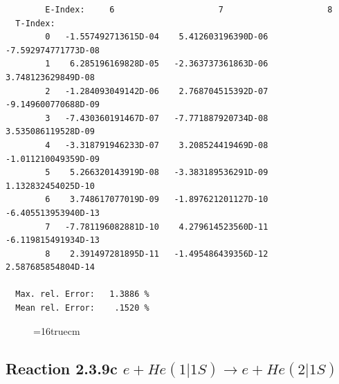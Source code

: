 \documentclass[12pt,dvips]{article}
\begin{document}
\begin{small}
\begin{verbatim}
        E-Index:     6                     7                     8
  T-Index:
        0   -1.557492713615D-04    5.412603196390D-06   -7.592974771773D-08
        1    6.285196169828D-05   -2.363737361863D-06    3.748123629849D-08
        2   -1.284093049142D-06    2.768704515392D-07   -9.149600770688D-09
        3   -7.430360191467D-07   -7.771887920734D-08    3.535086119528D-09
        4   -3.318791946233D-07    3.208524419469D-08   -1.011210049359D-09
        5    5.266320143919D-08   -3.383189536291D-09    1.132832454025D-10
        6    3.748617077019D-09   -1.897621201127D-10   -6.405513953940D-13
        7   -7.781196082881D-10    4.279614523560D-11   -6.119815491934D-13
        8    2.391497281895D-11   -1.495486439356D-12    2.587685854804D-14

  Max. rel. Error:   1.3886 %
  Mean rel. Error:    .1520 %

\end{verbatim}\end{small}
\begin{figure} \label{2.3.9b}
\epsfxsize=16truecm
\end{figure}
\newpage


\subsection{
Reaction 2.3.9c  $e + He(1|1S) \rightarrow e + He(2|1S) $
}
\end{document}
